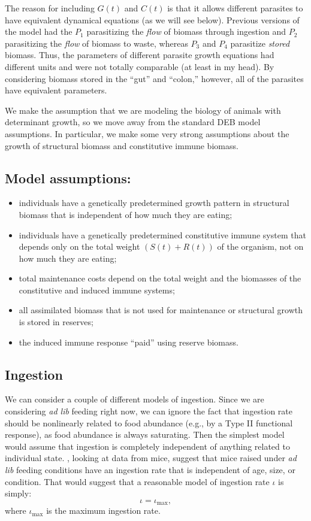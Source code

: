 \documentclass[12pt,reqno,final,pdftex]{amsart}\usepackage[]{graphicx}\usepackage[]{color}
\theoremstyle{plain}
\numberwithin{equation}{part}
\begin{document}
The reason for including $G(t)$ and $C(t)$ is that it allows different parasites to have equivalent dynamical equations (as we will see below).
Previous versions of the model had the $P_1$ parasitizing the \emph{flow} of biomass through ingestion and $P_2$ parasitizing the \emph{flow} of biomass to waste, whereas $P_3$ and $P_4$ parasitize \emph{stored} biomass.
Thus, the parameters of different parasite growth equations had different units and were not totally comparable (at least in my head).
By considering biomass stored in the ``gut'' and ``colon,'' however, all of the parasites have equivalent parameters.

We make the assumption that we are modeling the biology of animals with determinant growth, so we move away from the standard DEB model assumptions.
In particular, we make some very strong assumptions about the growth of structural biomass and constitutive immune biomass.

\subsection*{Model assumptions:}
\begin{itemize}
\item individuals have a genetically predetermined growth pattern in structural biomass that is independent of how much they are eating;
\item individuals have a genetically predetermined constitutive immune system that depends only on the total weight $(S(t)+R(t))$ of the organism, not on how much they are eating;
\item total maintenance costs depend on the total weight and the biomasses of the constitutive and induced immune systems;
\item all assimilated biomass that is not used for maintenance or structural growth is stored in reserves;
\item the induced immune response ``paid'' using reserve biomass.
\end{itemize}

\subsection*{Ingestion}
We can consider a couple of different models of ingestion.
Since we are considering \emph{ad lib} feeding right now, we can ignore the fact that ingestion rate should be nonlinearly related to food abundance (e.g., by a Type II functional response), as food abundance is always saturating.
Then the simplest model would assume that ingestion is completely independent of anything related to individual state.
\citet{vanLeeuwen2002}, looking at data from mice, suggest that mice raised under \emph{ad lib} feeding conditions have an ingestion rate that is independent of age, size, or condition.
That would suggest that a reasonable model of ingestion rate $\iota$ is simply:
\begin{equation}
\iota = \iota_{\max},
\end{equation}
where $\iota_{\max}$ is the maximum ingestion rate.
\end{document}
